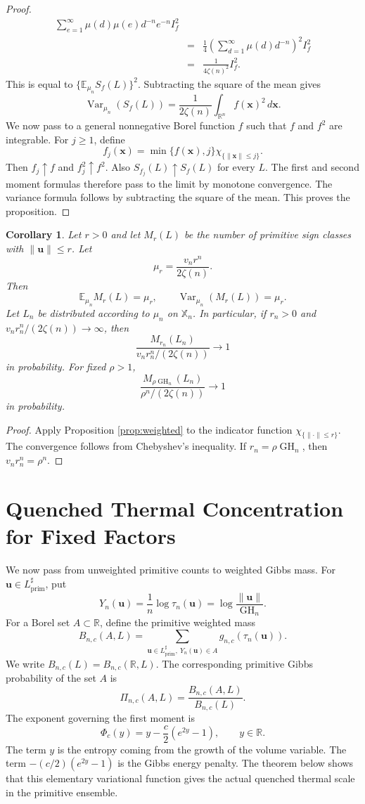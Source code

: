 \documentclass[a4paper,12pt]{article}
\newtheorem{cor}[thm]{Corollary}
\theoremstyle{definition}
\theoremstyle{remark}
\newcommand{\re}{\mathbb R}
\newcommand{\ex}{\mathbb E}
\newcommand{\GH}{\operatorname{GH}}
\newcommand{\prim}{\operatorname{prim}}
\newcommand{\Var}{\operatorname{Var}}
\begin{document}
\begin{proof}
\begin{eqnarray*}
\sum_{e=1}^{\infty}
\mu(d)\mu(e)d^{-n}e^{-n} I_f^2
\\
&=&
\frac{1}{4}
\left(\sum_{d=1}^{\infty}\mu(d)d^{-n}\right)^2 I_f^2
\\
&=&
\frac{1}{4\zeta(n)^2}I_f^2.
\end{eqnarray*}
This is equal to $\{\ex_{\mu_n}S_f(L)\}^2$.
Subtracting the square of the mean gives
$$
\Var_{\mu_n}(S_f(L))
=
\frac{1}{2\zeta(n)}
\int_{\re^n}f(\bm x)^2\,d\bm x.
$$
We now pass to a general nonnegative Borel function $f$ such that $f$ and $f^2$ are integrable.
For $j\ge1$, define
$$
f_j(\bm x)
=
\min\{f(\bm x),j\}\chi_{\{\|\bm x\|\le j\}}.
$$
Then $f_j\uparrow f$ and $f_j^2\uparrow f^2$.
Also $S_{f_j}(L)\uparrow S_f(L)$ for every $L$.
The first and second moment formulas therefore pass to the limit by monotone convergence.
The variance formula follows by subtracting the square of the mean.
This proves the proposition.
\end{proof}

\begin{cor}
\label{cor:primitivecounts}
Let $r>0$ and let $M_r(L)$ be the number of primitive sign classes with $\|\bm u\|\le r$.
Let
$$
\mu_r=\frac{v_nr^n}{2\zeta(n)}.
$$
Then
$$
\ex_{\mu_n}M_r(L)=\mu_r,
\qquad
\Var_{\mu_n}(M_r(L))=\mu_r.
$$
Let $L_n$ be distributed according to $\mu_n$ on $\mathbb X_n$.
In particular, if $r_n>0$ and $v_nr_n^n/(2\zeta(n))\to\infty$, then
$$
\frac{M_{r_n}(L_n)}{v_nr_n^n/(2\zeta(n))}\to1
$$
in probability.
For fixed $\rho>1$,
$$
\frac{M_{\rho\GH_n}(L_n)}{\rho^n/(2\zeta(n))}\to1
$$
in probability.
\end{cor}

\begin{proof}
Apply Proposition \ref{prop:weighted} to the indicator function $\chi_{\{\|\cdot\|\le r\}}$.
The convergence follows from Chebyshev's inequality.
If $r_n=\rho\GH_n$, then $v_nr_n^n=\rho^n$.
\end{proof}

\section{Quenched Thermal Concentration for Fixed Factors}
\label{sec:quenched}

We now pass from unweighted primitive counts to weighted Gibbs mass.
For $\bm u\in L_{\prim}^\sharp$, put
$$
Y_n(\bm u)=\frac{1}{n}\log\tau_n(\bm u)
=\log\frac{\|\bm u\|}{\GH_n}.
$$
For a Borel set $A\subset\re$, define the primitive weighted mass
$$
B_{n,c}(A,L)=
\sum_{\bm u\in L_{\prim}^\sharp,\ Y_n(\bm u)\in A}
 g_{n,c}(\tau_n(\bm u)).
$$
We write $B_{n,c}(L)=B_{n,c}(\re,L)$.
The corresponding primitive Gibbs probability of the set $A$ is
$$
\Pi_{n,c}(A,L)=\frac{B_{n,c}(A,L)}{B_{n,c}(L)}.
$$
The exponent governing the first moment is
$$
\Phi_c(y)=y-\frac{c}{2}(e^{2y}-1),
\qquad y\in\re.
$$
The term $y$ is the entropy coming from the growth of the volume variable.
The term $-(c/2)(e^{2y}-1)$ is the Gibbs energy penalty.
The theorem below shows that this elementary variational function gives the actual quenched thermal scale in the primitive ensemble.
\end{document}
